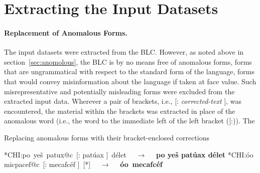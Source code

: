 \section{Extracting the Input Datasets}\label{sec:extr}
\paragraph{Replacement of Anomalous Forms.} 
The input datasets were extracted from the BLC. However, as noted above in 
section~\ref{sec:anomolous}, the BLC is by no means free of anomalous forms, 
forms that are ungrammatical with respect to the standard form of the language, 
forms that would convey misinformation about the language if taken at face value. 
Such misrepresentative and potentially misleading forms were excluded from the 
extracted input data. 
Wherever a pair of brackets, i.e., \textsf{[: \textit{corrected-text} ]}, was encountered, 
the material within the brackets was extracted in place of the anomalous word (i.e., the 
word to the immediate left of the left bracket (\textsf{[:})). The 


\begin{exe}\label{ex:replace}
	\ex Replacing anomalous forms with their bracket-enclosed corrections
	\begin{xlist}
	   \ex \textsf{*CHI:}\quad\textsf{po\, ye\v{s}\, patux@c\, [: pat\'{u}ax ]\, d\'{e}let} $\quad\to\quad$
	   \textbf{\textsf{po ye\v{s} pat\'{u}ax d\'{e}let}}
	   \ex \textsf{*CHI:}\quad\textsf{\textglotstop\'{o}o\, micpacef@c\, [: mecafc\'ef ]\, [*]} $\quad\to\quad$ \textbf{\textsf{\textglotstop\'oo\, mecafc\'ef}}
	\end{xlist}
\end{exe} 

